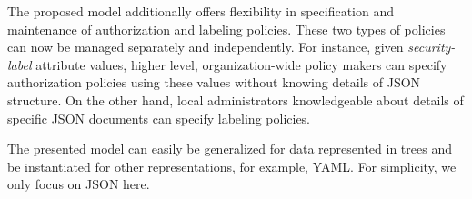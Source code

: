 





The proposed model additionally offers flexibility in specification and maintenance of  authorization and labeling policies. These two types of policies can now be managed separately and independently. For instance, given \textit{security-label} attribute values, higher level, organization-wide policy makers can specify authorization policies using these values without knowing details of JSON structure. On the other hand, local administrators knowledgeable about details of specific JSON documents can specify labeling policies. 


The presented model can easily be generalized for data represented in trees and be instantiated for other representations, for example, YAML. For simplicity, we only focus on JSON here.